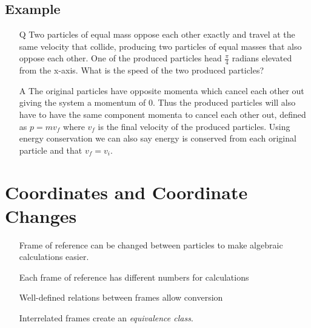 \documentclass[12pt,letterpaper, twocolumn]{article}
\begin{document}
    \subsection{Example}
    \begin{itemize}
        \item[Q] Two particles of equal mass oppose each other exactly and travel at the same velocity that collide, producing two particles of equal masses that also oppose each other. One of the produced particles head $\frac{\pi}{4}$ radians elevated from the x-axis. What is the speed of the two produced particles?
        \item[A] The original particles have opposite momenta which cancel each other out giving the system a momentum of 0. Thus the produced particles will also have to have the same component momenta to cancel each other out, defined as $p=mv_f$ where $v_f$ is the final velocity of the produced particles. Using energy conservation we can also say energy is conserved from each original particle and that $v_f = v_i$. 
    \end{itemize}

\section{Coordinates and Coordinate Changes}
\begin{itemize}
    \item[] Frame of reference can be changed between particles to make algebraic calculations easier. 
    \item[] Each frame of reference has different numbers for calculations
    \item[] Well-defined relations between frames allow conversion
    \item[] Interrelated frames create an \textit{equivalence class}. 
\end{itemize}
\end{document}
